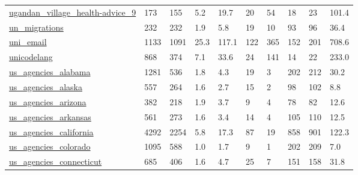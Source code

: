 \begin{longtable}{llllllllll}
 \href{https://www.repository.cam.ac.uk/handle/1810/270256?show=full}{ugandan\_village\_health-advice\_9}                      & 173        & 155   & 5.2    & 19.7   & 20    & 54     & 18     & 23     & 101.4   \\
 \href{https://www.un.org/en/development/desa/population/migration/data/estimates2/estimates15.asp}{un\_migrations}          & 232        & 232   & 1.9    & 5.8    & 19    & 10     & 93     & 96     & 36.4    \\
 \href{http://deim.urv.cat/~alexandre.arenas/data/xarxes}{uni\_email}                                                        & 1133       & 1091  & 25.3   & 117.1  & 122   & 365    & 152    & 201    & 708.6   \\
 \href{http://konect.cc/networks/unicodelang}{unicodelang}                                                                  & 868        & 374   & 7.1    & 33.6   & 24    & 141    & 14     & 22     & 233.0   \\
 \href{http://govmaps.cid.hks.harvard.edu}{us\_agencies\_alabama}                                                             & 1281       & 536   & 1.8    & 4.3    & 19    & 3      & 202    & 212    & 30.2    \\
 \href{http://govmaps.cid.hks.harvard.edu}{us\_agencies\_alaska}                                                              & 557        & 264   & 1.6    & 2.7    & 15    & 2      & 98     & 102    & 8.8     \\
 \href{http://govmaps.cid.hks.harvard.edu}{us\_agencies\_arizona}                                                             & 382        & 218   & 1.9    & 3.7    & 9     & 4      & 78     & 82     & 12.6    \\
 \href{http://govmaps.cid.hks.harvard.edu}{us\_agencies\_arkansas}                                                            & 561        & 273   & 1.6    & 3.4    & 14    & 4      & 105    & 110    & 12.5    \\
 \href{http://govmaps.cid.hks.harvard.edu}{us\_agencies\_california}                                                          & 4292       & 2254  & 5.8    & 17.3   & 87    & 19     & 858    & 901    & 122.3   \\
 \href{http://govmaps.cid.hks.harvard.edu}{us\_agencies\_colorado}                                                            & 1095       & 588   & 1.0    & 1.7    & 9     & 1      & 202    & 209    & 7.0     \\
 \href{http://govmaps.cid.hks.harvard.edu}{us\_agencies\_connecticut}                                                         & 685        & 406   & 1.6    & 4.7    & 25    & 7      & 151    & 158    & 31.8    \\

\end{longtable}
